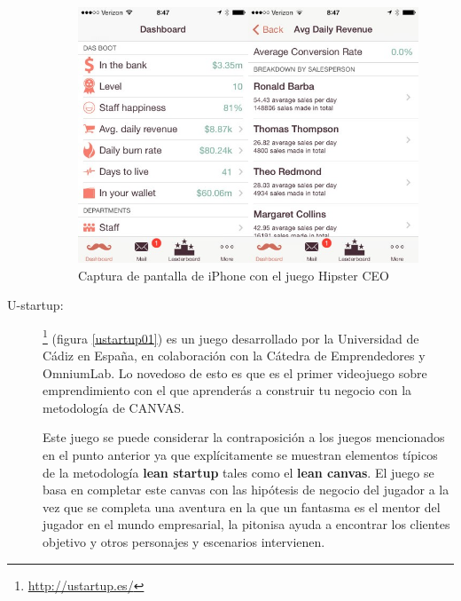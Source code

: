 \begin{description}
\begin{figure}
\begin{center}
\includegraphics[scale=0.6]{imagenes/hipster01.jpg}
\caption{Captura de pantalla de iPhone con el juego Hipster CEO}
\label{hipster01}
\end{center}
\end{figure}

	\item [U-startup:] \footnote{\url{http://ustartup.es/}} (figura \ref{ustartup01}) es un juego desarrollado por la Universidad de Cádiz en España, en colaboración con la Cátedra de Emprendedores y OmniumLab. Lo novedoso de esto es que es el primer videojuego sobre emprendimiento con el que aprenderás a construir tu negocio con la metodología de CANVAS. \cite{danieladelbosque2016}
	
Este juego se puede considerar la contraposición a los juegos mencionados en el punto anterior ya que explícitamente se muestran elementos típicos de la metodología \textbf{lean startup} tales como el \textbf{lean canvas}. El juego se basa en completar este canvas con las hipótesis de negocio del jugador a la vez que se completa una aventura en la que un fantasma es el mentor del jugador en el mundo empresarial, la pitonisa ayuda a encontrar los clientes objetivo y otros personajes y escenarios intervienen.
	

\end{description}
